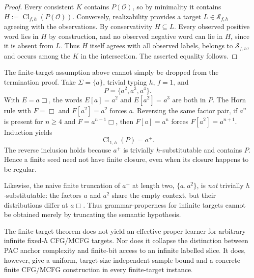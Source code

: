 \begin{proof}
Every consistent \(K\) contains \(P(\mathcal O)\),
so by minimality it contains
\(H:=\operatorname{Cl}_{f,h}(P(\mathcal O))\).
Conversely, realizability provides a target
\(L\in\mathcal S_{f,h}\) agreeing with the
observations.  By conservativity
\(H\subseteq L\).  Every observed positive
word lies in \(H\) by construction, and no
observed negative word can lie in \(H\),
since it is absent from \(L\).
Thus \(H\) itself agrees with all observed
labels, belongs to \(\mathcal S_{f,h}\),
and occurs among the \(K\) in the
intersection.  The asserted equality follows.
\end{proof}

\begin{remark}
\label{ex:finite-seed-infinite-closure}
The finite-target assumption above cannot
simply be dropped from the termination proof.
Take \(\Sigma=\{a\}\), trivial typing \(h\),
\(f=1\), and
\[
 P=\{a^2,a^3,a^4\}.
\]
With \(E=a\Box\), the words
\(E[a]=a^2\) and \(E[a^2]=a^3\)
are both in \(P\).
The Horn rule with \(F=\Box\) and \(F[a^2]=a^2\)
forces \(a\).  Reversing the same factor
pair, if \(a^n\) is present for \(n\ge4\)
and \(F=a^{n-1}\Box\), then \(F[a]=a^n\)
forces \(F[a^2]=a^{n+1}\).
Induction yields
\[
 \operatorname{Cl}_{1,h}(P)=a^+.
\]
The reverse inclusion holds because \(a^+\)
is trivially \(h\)-substitutable and
contains \(P\).  Hence a finite seed need
not have finite closure, even when its
closure happens to be regular.

Likewise, the naive finite truncation of
\(a^+\) at length two,
\(\{a,a^2\}\), is \emph{not}
trivially \(h\)-substitutable:
the factors \(a\) and \(a^2\)
share the empty context, but their
distributions differ at \(a\Box\).
Thus grammar-properness for infinite
targets cannot be obtained merely by
truncating the semantic hypothesis.
\end{remark}

\begin{remark}
The finite-target theorem does not yield
an effective proper learner for
arbitrary infinite fixed-\(h\)
CFG/MCFG targets.  Nor does it collapse
the distinction between PAC anchor
complexity and finite-bit access to
an infinite labelled slice.  It does,
however, give a uniform, target-size
independent sample bound and a concrete
finite CFG/MCFG construction in every
finite-target instance.
\end{remark}
